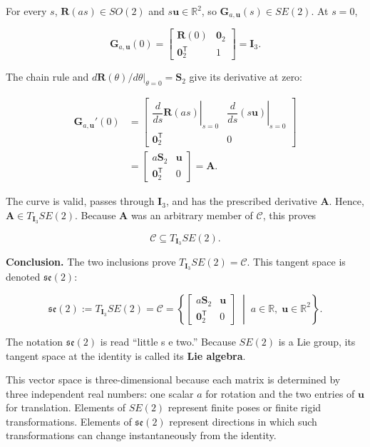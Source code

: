 \documentclass[
  australian,
  12pt,
  letterpaper,
  DIV=11,
  numbers=noendperiod,
  twoside]{scrreprt}
\begin{document}
For every \(s\), \(\mathbf R(as)\in SO(2)\) and
\(s\mathbf u\in\mathbb R^2\), so
\(\mathbf G_{a,\mathbf u}(s)\in SE(2)\). At \(s=0\),

\[
\mathbf G_{a,\mathbf u}(0)
=
\begin{bmatrix}
\mathbf R(0)&\mathbf 0_2\\
\mathbf 0_2^\mathsf T&1
\end{bmatrix}
=
\mathbf I_3.
\]

The chain rule and
\(d\mathbf R(\theta)/d\theta|_{\theta=0}=\mathbf S_2\) give its
derivative at zero:

\[
\begin{aligned}
\mathbf G_{a,\mathbf u}'(0)
&=
\begin{bmatrix}
\left.\dfrac{d}{ds}\mathbf R(as)\right|_{s=0}&
\left.\dfrac{d}{ds}(s\mathbf u)\right|_{s=0}\\[6pt]
\mathbf 0_2^\mathsf T&0
\end{bmatrix}\\
&=
\begin{bmatrix}
a\mathbf S_2&\mathbf u\\
\mathbf 0_2^\mathsf T&0
\end{bmatrix}
=
\mathbf A.
\end{aligned}
\]

The curve is valid, passes through \(\mathbf I_3\), and has the
prescribed derivative \(\mathbf A\). Hence,
\(\mathbf A\in T_{\mathbf I_3}SE(2)\). Because \(\mathbf A\) was an
arbitrary member of \(\mathcal C\), this proves

\[
\mathcal C
\subseteq
T_{\mathbf I_3}SE(2).
\]

\textbf{Conclusion.} The two inclusions prove
\(T_{\mathbf I_3}SE(2)=\mathcal C\). This tangent space is denoted
\(\mathfrak{se}(2)\):

\[
\boxed{
\mathfrak{se}(2)
\mathrel{:=}
T_{\mathbf I_3}SE(2)
=
\mathcal C
=
\left\{
\begin{bmatrix}
a\mathbf S_2&\mathbf u\\
\mathbf 0_2^\mathsf T&0
\end{bmatrix}
\;\middle|\;
a\in\mathbb R,\;
\mathbf u\in\mathbb R^2
\right\}
}.
\]

The notation \(\mathfrak{se}(2)\) is read ``little s e two.'' Because
\(SE(2)\) is a Lie group, its tangent space at the identity is called
its \textbf{Lie algebra}.

This vector space is three-dimensional because each matrix is determined
by three independent real numbers: one scalar \(a\) for rotation and the
two entries of \(\mathbf u\) for translation. Elements of \(SE(2)\)
represent finite poses or finite rigid transformations. Elements of
\(\mathfrak{se}(2)\) represent directions in which such transformations
can change instantaneously from the identity.
\end{document}
